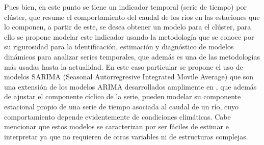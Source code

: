 \documentclass[12pt,oneside]{book}\usepackage[]{graphicx}\usepackage[]{color}
\theoremstyle{definition} %
\begin{document}
Pues bien, en este punto se tiene un indicador temporal (serie de tiempo) por clúster, que resume el comportamiento del caudal de los ríos en las estaciones que lo componen, a partir de este, se desea obtener un modelo para el clúster, para ello se propone modelar este indicador usando la metodología \citeauthor{box1970time} \citeyear{box1970time} que se conoce por su rigurosidad para la identificación, estimación y diagnóstico de modelos dinámicos para analizar series temporales, que además es una de las metodologías más usadas hasta la actualidad.
En este caso particular se propone el uso de modelos SARIMA (Seasonal Autorregresive Integrated Movile Average) que son una extensión de los modelos ARIMA desarrollados amplimente en \citeauthor{box2015time} \citeyear{box2015time}, que además de ajustar el componente cíclico de la serie, pueden modelar su componente estacional propio de una serie de tiempo asociada al caudal de un río, cuyo comportamiento depende evidentemente de condiciones climáticas. Cabe mencionar que estos modelos se caracterizan por ser fáciles de estimar e interpretar ya que no requieren de otras variables ni de estructuras complejas.

%


\end{document}
